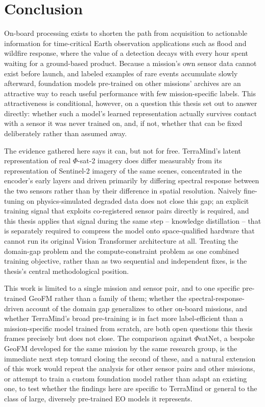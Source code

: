 \chapter{Conclusion}
\label{chap:conclusion}

On-board processing exists to shorten the path from acquisition to actionable information for time-critical Earth observation applications such as flood and wildfire response, where the value of a detection decays with every hour spent waiting for a ground-based product.
Because a mission's own sensor data cannot exist before launch, and labeled examples of rare events accumulate slowly afterward, foundation models pre-trained on other missions' archives are an attractive way to reach useful performance with few mission-specific labels.
This attractiveness is conditional, however, on a question this thesis set out to answer directly: whether such a model's learned representation actually survives contact with a sensor it was never trained on, and, if not, whether that can be fixed deliberately rather than assumed away.

The evidence gathered here says it can, but not for free.
TerraMind's latent representation of real $\Phi$-sat-2 imagery does differ measurably from its representation of Sentinel-2 imagery of the same scenes, concentrated in the encoder's early layers and driven primarily by differing spectral response between the two sensors rather than by their difference in spatial resolution.
Naively fine-tuning on physics-simulated degraded data does not close this gap; an explicit training signal that exploits co-registered sensor pairs directly is required, and this thesis applies that signal during the same step -- knowledge distillation -- that is separately required to compress the model onto space-qualified hardware that cannot run its original Vision Transformer architecture at all.
Treating the domain-gap problem and the compute-constraint problem as one combined training objective, rather than as two sequential and independent fixes, is the thesis's central methodological position.

This work is limited to a single mission and sensor pair, and to one specific pre-trained GeoFM rather than a family of them; whether the spectral-response-driven account of the domain gap generalizes to other on-board missions, and whether TerraMind's broad pre-training is in fact more label-efficient than a mission-specific model trained from scratch, are both open questions this thesis frames precisely but does not close.
The comparison against $\Phi$satNet, a bespoke GeoFM developed for the same mission by the same research group, is the immediate next step toward closing the second of these, and a natural extension of this work would repeat the analysis for other sensor pairs and other missions, or attempt to train a custom foundation model rather than adapt an existing one, to test whether the findings here are specific to TerraMind or general to the class of large, diversely pre-trained EO models it represents.
